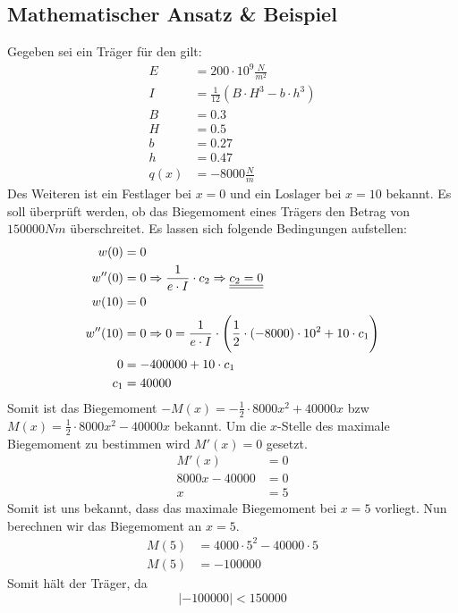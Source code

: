 \documentclass[a4paper,12pt]{article}
\begin{document}
\subsection{Mathematischer Ansatz \& Beispiel}
Gegeben sei ein Träger für den gilt:
\begin{equation*}
\begin{split}
E & = 200 \cdot 10^9 \frac{N}{m^2}\\
I & = \frac{1}{12}(B \cdot H^3 - b \cdot h^3)\\
B & = 0.3\\
H & = 0.5\\
b & = 0.27\\
h & = 0.47\\
q(x) & = -8000 \frac{N}{m}
\end{split}
\end{equation*}
Des Weiteren ist ein Festlager bei $x = 0$ und ein Loslager bei $x = 10$ bekannt.
Es soll überprüft werden, ob das Biegemoment eines Trägers den Betrag von $150000 Nm$ überschreitet.
Es lassen sich folgende Bedingungen aufstellen:
\begin{equation*}
\begin{split}
w(0) & = 0\\
w''(0) & = 0 \Rightarrow \frac{1}{e \cdot I} \cdot c_2 \Rightarrow \underline{\underline{c_2 = 0}}\\
w(10) & = 0\\
w''(10) & = 0 \Rightarrow 0 = \frac{1}{e \cdot I} \cdot \Bigg{(}\frac{1}{2} \cdot (-8000) \cdot 10^2 + 10 \cdot c_1\Bigg{)}\\
0 & = -400000 + 10 \cdot c_1\\
c_1 & = 40000
\end{split}
\end{equation*}
Somit ist das Biegemoment $- M(x) = - \frac{1}{2} \cdot 8000x^2 + 40000x$ bzw $M(x) = \frac{1}{2} \cdot 8000x^2 - 40000x$ bekannt.
Um die $x$-Stelle des maximale Biegemoment zu bestimmen wird $M'(x) = 0$ gesetzt.
\begin{equation*}
\begin{split}
M'(x) & = 0\\
8000x - 40000 & = 0\\
x & = 5
\end{split}
\end{equation*}
Somit ist uns bekannt, dass das maximale Biegemoment bei $x = 5$ vorliegt.
Nun berechnen wir das Biegemoment an $x = 5$.
\begin{equation*}
\begin{split}
M(5) & = 4000 \cdot 5^2 - 40000 \cdot 5\\
M(5) & = -100000
\end{split}
\end{equation*}
Somit hält der Träger, da
$$|-100000| < 150000$$
\end{document}
